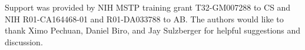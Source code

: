 Support was provided by NIH MSTP training grant T32-GM007288 to CS and NIH R01-CA164468-01 and R01-DA033788 to AB. The authors would like to thank Ximo Pechuan, Daniel Biro, and Jay Sulzberger for helpful suggestions and discussion.
